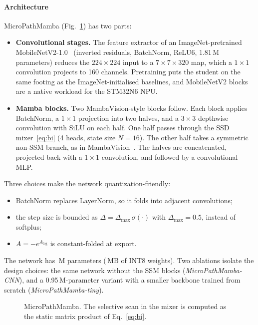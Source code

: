 \documentclass[preprint,12pt]{elsarticle}
\newcommand{\todo}[1]{\textcolor{blue}{[#1]}}
\begin{document}
\paragraph{Architecture}
MicroPathMamba (Fig.~\ref{fig:arch}) has two parts:
\begin{itemize}
\item \textbf{Convolutional stages.} The feature extractor of an ImageNet-pretrained MobileNetV2-1.0~\cite{sandler2018mobilenetv2} (inverted residuals, BatchNorm, ReLU6, 1.81\,M parameters) reduces the $224\times224$ input to a $7\times7\times320$ map, which a $1\times1$ convolution projects to 160 channels. Pretraining puts the student on the same footing as the ImageNet-initialised baselines, and MobileNetV2 blocks are a native workload for the STM32N6 NPU.
\item \textbf{Mamba blocks.} Two MambaVision-style blocks follow. Each block applies BatchNorm, a $1\times1$ projection into two halves, and a $3\times3$ depthwise convolution with SiLU on each half. One half passes through the SSD mixer~\eqref{eq:bi} (4 heads, state size $N=16$). The other half takes a symmetric non-SSM branch, as in MambaVision~\cite{hatamizadeh2025mambavision}. The halves are concatenated, projected back with a $1\times1$ convolution, and followed by a convolutional MLP.
\end{itemize}

Three choices make the network quantization-friendly:
\begin{itemize}
\item BatchNorm replaces LayerNorm, so it folds into adjacent convolutions;
\item the step size is bounded as $\Delta=\Delta_{\max}\,\sigma(\cdot)$ with $\Delta_{\max}=0.5$, instead of softplus;
\item $A=-e^{A_{\log}}$ is constant-folded at export.
\end{itemize}
The network has \resStudentParams\,M parameters (\resStudentIntEightMB\,MB of INT8 weights). Two ablations isolate the design choices: the same network without the SSM blocks (\emph{MicroPathMamba-CNN}), and a 0.95\,M-parameter variant with a smaller backbone trained from scratch (\emph{MicroPathMamba-tiny}).

\begin{figure}[t]\centering
\fbox{\parbox{0.9\linewidth}{\centering\vspace{2.5cm}\todo{Fig.~1: architecture diagram (CNN stages $\rightarrow$ 2$\times$ SSD-Mamba blocks $\rightarrow$ head) with the matrix-form mixer inset}\vspace{2.5cm}}}
\caption{MicroPathMamba. The selective scan in the mixer is computed as the static matrix product of Eq.~\eqref{eq:bi}.}
\label{fig:arch}
\end{figure}
\end{document}
